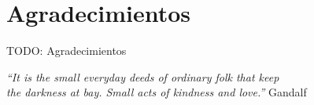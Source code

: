 \chapter*{Agradecimientos}

TODO: Agradecimientos

\begin{flushright}
\textit{``It is the small everyday deeds of ordinary folk that keep\\ the darkness at bay. Small acts of kindness and love.''}
Gandalf
\end{flushright}
